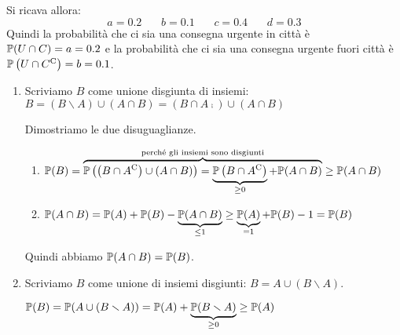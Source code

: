 Si ricava allora:
\begin{equation*}
a=0.2\ \ \ \ \ \ \ \ b=0.1\ \ \ \ \ \ \ \ c=0.4\ \ \ \ \ \ \ \ d=0.3
\end{equation*}
Quindi la probabilità che ci sia una consegna urgente in città è $\P( U\cap C) =a=0.2$ e la probabilità che ci sia una consegna urgente fuori città è $\P\left( U\cap C\comp\right) =b=0.1$.
\Soluzione
\begin{enumerate}
\item Scriviamo $B$ come unione disgiunta di insiemi: $B=( B\smallsetminus A) \cup ( A\cap B) =\left( B\cap A\comp\right) \cup ( A\cap B)$

Dimostriamo le due disuguaglianze.
\begin{enumerate}
\item $\P( B) =\overbrace{\P\left(\left( B\cap A\comp\right) \cup ( A\cap B)\right) =\underbrace{\P\left( B\cap A\comp\right)}_{\geq 0} +\P( A\cap B)}^{\text{perché gli insiemi sono disgiunti}} \geq \P( A\cap B)$
\item $\P( A\cap B) =\P( A) +\P( B) -\underbrace{\P( A\cap B)}_{\leq 1} \geq \underbrace{\P( A)}_{=1} +\P( B) -1=\P( B)$
\end{enumerate}

Quindi abbiamo $\P( A\cap B) =\P( B)$.
\item Scriviamo $B$ come unione di insiemi disgiunti: $B=A\cup ( B\smallsetminus A)$.

$\P( B) =\P( A\cup ( B\smallsetminus A)) =\P( A) +\underbrace{\P( B\smallsetminus A)}_{\geq 0} \geq \P( A)$
\end{enumerate}
\Soluzione


